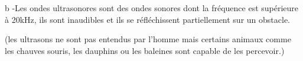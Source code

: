 \documentclass[12pt]{article}
\begin{document}
\begin{tcolorbox}
b -Les ondes ultrasonores sont des ondes sonores dont la fréquence est supérieure à 20kHz, ils sont inaudibles et ils se réfléchissent
partiellement sur un obstacle.

(les ultrasons ne sont pas entendus par l’homme mais certains animaux comme les chauves souris, les dauphins ou les baleines
sont capable de les percevoir.)

\end{tcolorbox}



\end{document}
